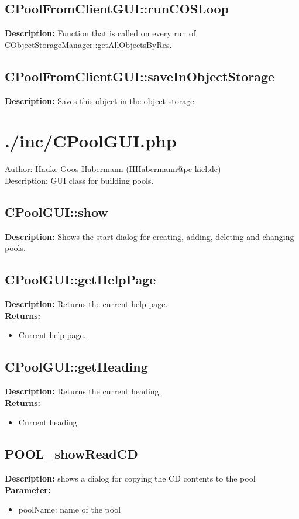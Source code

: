 \subsection{CPoolFromClientGUI::runCOSLoop}
\textbf{Description:} Function that is called on every run of CObjectStorageManager::getAllObjectsByRes.\\

\subsection{CPoolFromClientGUI::saveInObjectStorage}
\textbf{Description:} Saves this object in the object storage.\\

\newpage\section{./inc/CPoolGUI.php}
 Author: Hauke Goos-Habermann (HHabermann@pc-kiel.de)\\
 Description: GUI class for building pools.\\

\subsection{CPoolGUI::show}
\textbf{Description:} Shows the start dialog for creating, adding, deleting and changing pools.\\

\subsection{CPoolGUI::getHelpPage}
\textbf{Description:} Returns the current help page.\\
\textbf{Returns:}
\begin{itemize}
\item Current help page.
\end{itemize}

\subsection{CPoolGUI::getHeading}
\textbf{Description:} Returns the current heading.\\
\textbf{Returns:}
\begin{itemize}
\item Current heading.
\end{itemize}

\subsection{POOL\_showReadCD}
\textbf{Description:} shows a dialog for copying the CD contents to the pool\\
\textbf{Parameter:}
\begin{itemize}
\item poolName: name of the pool
\end{itemize}

